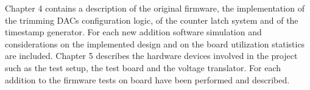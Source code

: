 \vspace{0.25cm}
\newline
Chapter 4 contains a description of the original firmware, the implementation of the trimming DACs configuration logic, of the counter latch system and of the timestamp generator. For each new addition software simulation and considerations on the implemented design and on the board utilization statistics are included.
\vspace{0.25cm}
\newline
Chapter 5 describes the hardware devices involved in the project such as the test setup, the test board and the voltage translator. For each addition to the firmware tests on board have been performed and described.
